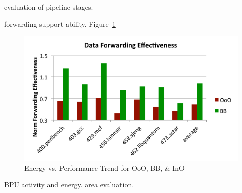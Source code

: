 evaluation of pipeline stages.

forwarding support ability. Figure~\ref{fig:forwarding}
\begin{figure}[h]
	\centering
	\includegraphics[width=1.0\columnwidth]{result/forwarding.pdf} 
    \caption{Energy vs. Performance Trend for OoO, BB, \& InO}
	\label{fig:forwarding}
\end{figure}

BPU activity and energy.
area evaluation.


